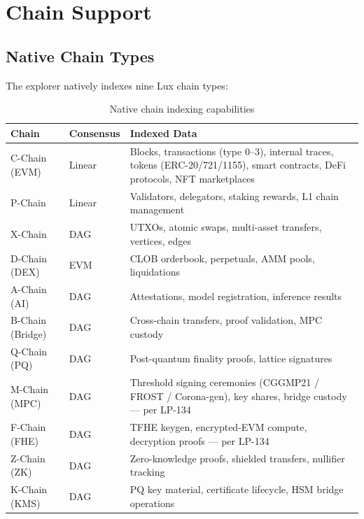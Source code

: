 

\section{Chain Support}


\subsection{Native Chain Types}

The explorer natively indexes nine Lux chain types:

\begin{table}[H]
\centering
\begin{tabularx}{\textwidth}{llX}
\toprule
\textbf{Chain} & \textbf{Consensus} & \textbf{Indexed Data} \\
\midrule
C-Chain (EVM) & Linear & Blocks, transactions (type 0--3), internal traces, tokens (ERC-20/721/1155), smart contracts, DeFi protocols, NFT marketplaces \\
P-Chain & Linear & Validators, delegators, staking rewards, L1 chain management \\
X-Chain & DAG & UTXOs, atomic swaps, multi-asset transfers, vertices, edges \\
D-Chain (DEX) & EVM & CLOB orderbook, perpetuals, AMM pools, liquidations \\
A-Chain (AI) & DAG & Attestations, model registration, inference results \\
B-Chain (Bridge) & DAG & Cross-chain transfers, proof validation, MPC custody \\
Q-Chain (PQ) & DAG & Post-quantum finality proofs, lattice signatures \\
M-Chain (MPC) & DAG & Threshold signing ceremonies (CGGMP21 / FROST / Corona-gen), key shares, bridge custody — per LP-134 \\
F-Chain (FHE) & DAG & TFHE keygen, encrypted-EVM compute, decryption proofs — per LP-134 \\
Z-Chain (ZK) & DAG & Zero-knowledge proofs, shielded transfers, nullifier tracking \\
K-Chain (KMS) & DAG & PQ key material, certificate lifecycle, HSM bridge operations \\
\bottomrule
\end{tabularx}
\caption{Native chain indexing capabilities}
\end{table}

